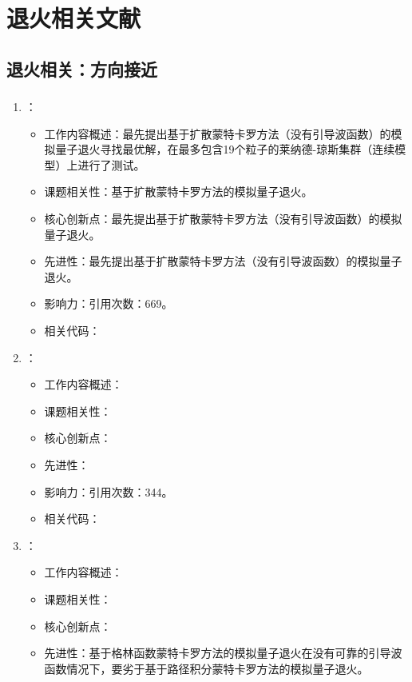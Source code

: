 \chapter{退火相关文献}
\section{退火相关：方向接近}
\subsection{}
    \begin{enumerate}
        \item \citet{finnila1994quantum}：
            \begin{itemize}
                \item 工作内容概述：最先提出基于扩散蒙特卡罗方法（没有引导波函数）的模拟量子退火寻找最优解，在最多包含19个粒子的莱纳德-琼斯集群（连续模型）上进行了测试。
                \item 课题相关性：基于扩散蒙特卡罗方法的模拟量子退火。
                \item 核心创新点：最先提出基于扩散蒙特卡罗方法（没有引导波函数）的模拟量子退火。
                \item 先进性：最先提出基于扩散蒙特卡罗方法（没有引导波函数）的模拟量子退火。
                \item 影响力：引用次数：669。
                \item 相关代码：
            \end{itemize}
        \item \citet{santoro2006optimization}：
        \begin{itemize}
            \item 工作内容概述：
            \item 课题相关性：
            \item 核心创新点：
            \item 先进性：
            \item 影响力：引用次数：344。
            \item 相关代码：
        \end{itemize}
        \item \citet{stella2007quantum}：
            \begin{itemize}
                \item 工作内容概述：
                \item 课题相关性：
                \item 核心创新点：
                \item 先进性：基于格林函数蒙特卡罗方法的模拟量子退火在没有可靠的引导波函数情况下，要劣于基于路径积分蒙特卡罗方法的模拟量子退火。

\end{itemize}
\end{enumerate}
